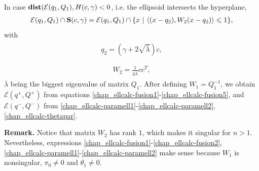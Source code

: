 \documentclass[letterpaper,10pt,english]{sphinxmanual}
\begin{document}
In case \({\bf dist}({\mathcal E}(q_1,Q_1),H(c,\gamma)<0\), i.e. the
ellipsoid intersects the hyperplane,
\begin{gather}
\begin{split}{\mathcal E}(q_1,Q_1)\cap{\bf S}(c,\gamma) =
{\mathcal E}(q_1,Q_1)\cap\{x ~|~ \langle (x-q_2),W_2(x-q_2)\rangle\leqslant1\},\end{split}\notag
\end{gather}
with
\label{chap_ellcalc:equation-hsell1}\begin{gather}
\begin{split}q_2  =  (\gamma + 2\sqrt{\overline{\lambda}})c,\\\end{split}\label{chap_ellcalc-hsell1}
\end{gather}\label{chap_ellcalc:equation-hsell2}\begin{gather}
\begin{split}W_2  =  \frac{1}{4\overline{\lambda}}cc^T,\end{split}\label{chap_ellcalc-hsell2}
\end{gather}
\(\overline{\lambda}\) being the biggest eigenvalue of matrix
\(Q_1\). After defining \(W_1=Q_1^{-1}\), we obtain
\({\mathcal E}(q^+,Q^+)\) from equations \eqref{chap_ellcalc-fusion1}-\eqref{chap_ellcalc-fusion5}, and
\({\mathcal E}(q^-,Q^-)\) from \eqref{chap_ellcalc-paramell1}-\eqref{chap_ellcalc-paramell2},
\eqref{chap_ellcalc-thetapar}.

\textbf{Remark.} Notice that matrix \(W_2\) has rank \(1\), which
makes it singular for \(n>1\). Nevertheless, expressions
\eqref{chap_ellcalc-fusion1}-\eqref{chap_ellcalc-fusion2}, \eqref{chap_ellcalc-paramell1}-\eqref{chap_ellcalc-paramell2} make sense because
\(W_1\) is nonsingular, \(\pi_0\neq0\) and
\(\hat{\theta}_1\neq0\).
\end{document}
